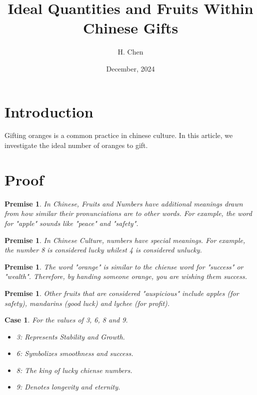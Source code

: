 \documentclass[10pt,a4paper]{article}
\newtheorem{premise}[theorem]{Premise}
\newtheorem{case}[theorem]{Case}
\begin{document}
\title{Ideal Quantities and Fruits Within Chinese Gifts}
\author{H. Chen}
\date{December, 2024}
\maketitle

\section{Introduction}
Gifting oranges is a common practice in chinese culture. In this article, we investigate the ideal number of oranges to gift.

\section{Proof}
\begin{premise}
    In Chinese, Fruits and Numbers have additional meanings drawn from how similar their pronunciations are to other words. For example, the word for "apple" sounds like "peace" and "safety".
\end{premise}

\begin{premise}
    In Chinese Culture, numbers have special meanings. For example, the number 8 is considered lucky whilest 4 is considered unlucky.
\end{premise}

\begin{premise}
    The word "orange" is similar to the chiense word for "success" or "wealth". Therefore, by handing someone orange, you are wishing them success.
\end{premise}

\begin{premise}
    Other fruits that are considered "auspicious" include apples (for safety), mandarins (good luck) and lychee (for profit).
\end{premise}

\begin{case}
    For the values of 3, 6, 8 and 9.

    \begin{itemize}
        \item 3: Represents Stability and Growth. 
        \item 6: Symbolizes smoothness and success.
        \item 8: The king of lucky chiense numbers.
        \item 9: Denotes longevity and eternity.
    \end{itemize}

\end{case}
\end{document}
